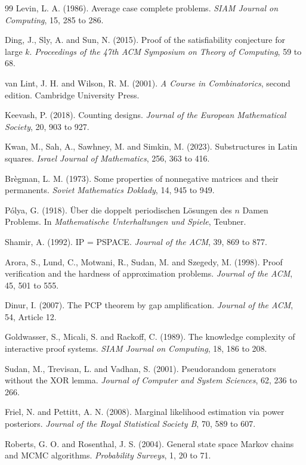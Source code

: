 \documentclass[11pt,twoside,openany]{book}
\theoremstyle{plain}
\theoremstyle{definition}
\theoremstyle{remark}
\begin{document}
\begin{thebibliography}{99}
 Levin, L. A. (1986). Average case complete problems. \emph{SIAM Journal on Computing}, 15, 285 to 286.

 Ding, J., Sly, A. and Sun, N. (2015). Proof of the satisfiability conjecture for large $k$. \emph{Proceedings of the 47th ACM Symposium on Theory of Computing}, 59 to 68.

 van Lint, J. H. and Wilson, R. M. (2001). \emph{A Course in Combinatorics}, second edition. Cambridge University Press.

 Keevash, P. (2018). Counting designs. \emph{Journal of the European Mathematical Society}, 20, 903 to 927.

 Kwan, M., Sah, A., Sawhney, M. and Simkin, M. (2023). Substructures in Latin squares. \emph{Israel Journal of Mathematics}, 256, 363 to 416.

 Br\`egman, L. M. (1973). Some properties of nonnegative matrices and their permanents. \emph{Soviet Mathematics Doklady}, 14, 945 to 949.

 P\'olya, G. (1918). \"Uber die doppelt periodischen L\"osungen des $n$ Damen Problems. In \emph{Mathematische Unterhaltungen und Spiele}, Teubner.

 Shamir, A. (1992). IP = PSPACE. \emph{Journal of the ACM}, 39, 869 to 877.

 Arora, S., Lund, C., Motwani, R., Sudan, M. and Szegedy, M. (1998). Proof verification and the hardness of approximation problems. \emph{Journal of the ACM}, 45, 501 to 555.

 Dinur, I. (2007). The PCP theorem by gap amplification. \emph{Journal of the ACM}, 54, Article 12.

 Goldwasser, S., Micali, S. and Rackoff, C. (1989). The knowledge complexity of interactive proof systems. \emph{SIAM Journal on Computing}, 18, 186 to 208.

 Sudan, M., Trevisan, L. and Vadhan, S. (2001). Pseudorandom generators without the XOR lemma. \emph{Journal of Computer and System Sciences}, 62, 236 to 266.

 Friel, N. and Pettitt, A. N. (2008). Marginal likelihood estimation via power posteriors. \emph{Journal of the Royal Statistical Society B}, 70, 589 to 607.

 Roberts, G. O. and Rosenthal, J. S. (2004). General state space Markov chains and MCMC algorithms. \emph{Probability Surveys}, 1, 20 to 71.


\end{thebibliography}
\end{document}
